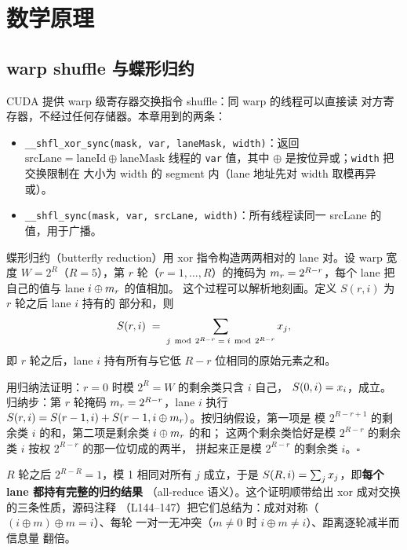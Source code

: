 \section{数学原理}\label{sec:ch02-math}

\subsection{warp shuffle 与蝶形归约}

CUDA 提供 warp 级寄存器交换指令 shuffle：同 warp 的线程可以直接读
对方寄存器，不经过任何存储器。本章用到的两条：

\begin{itemize}
\item \texttt{\_\allowbreak{}\_\allowbreak{}shfl\_\allowbreak{}xor\_\allowbreak{}sync\allowbreak{}(mask,\allowbreak{} var,\allowbreak{} lane\allowbreak{}Mask,\allowbreak{} width)}：返回
  $\mathrm{srcLane} = \mathrm{laneId} \oplus \mathrm{laneMask}$ 线程的
  \texttt{var} 值，其中 $\oplus$ 是按位异或；\texttt{width} 把交换限制在
  大小为 width 的 segment 内（lane 地址先对 width 取模再异或）。
\item \texttt{\_\allowbreak{}\_\allowbreak{}shfl\_\allowbreak{}sync\allowbreak{}(mask,\allowbreak{} var,\allowbreak{} src\allowbreak{}Lane,\allowbreak{} width)}：所有线程读同一
  srcLane 的值，用于广播。
\end{itemize}

蝶形归约（butterfly reduction）用 xor 指令构造两两相对的 lane 对。设 warp
宽度 $W = 2^{R}$（$R = 5$），第 $r$ 轮（$r = 1, \dots, R$）的掩码为
$m\sb r = 2^{R-r}$，每个 lane 把自己的值与 lane $i \oplus m\sb r$ 的值相加。
这个过程可以解析地刻画。定义 $S(r, i)$ 为 $r$ 轮之后 lane $i$ 持有的
部分和，则
\begin{equation}
  S(r, i) \;=\; \sum\sb{j \,\bmod\, 2^{R-r} \;=\; i \,\bmod\, 2^{R-r}} x\sb j,
  \label{eq:ch02-invariant}
\end{equation}
即 $r$ 轮之后，lane $i$ 持有所有与它低 $R-r$ 位相同的原始元素之和。

用归纳法证明：$r = 0$ 时模 $2^{R} = W$ 的剩余类只含 $i$ 自己，
$S(0, i) = x\sb i$，成立。归纳步：第 $r$ 轮掩码 $m\sb r = 2^{R-r}$，lane $i$
执行 $S(r, i) = S(r-1, i) + S(r-1, i \oplus m\sb r)$。按归纳假设，第一项是
模 $2^{R-r+1}$ 的剩余类 $i$ 的和，第二项是剩余类 $i \oplus m\sb r$ 的和；
这两个剩余类恰好是模 $2^{R-r}$ 的剩余类 $i$ 按权 $2^{R-r}$ 的那一位切成的两半，
拼起来正是模 $2^{R-r}$ 的剩余类 $i$。$\square$

$R$ 轮之后 $2^{R-R} = 1$，模 1 相同对所有 $j$ 成立，于是
$S(R, i) = \sum\sb j x\sb j$，即\textbf{每个 lane 都持有完整的归约结果}
（all-reduce 语义）。这个证明顺带给出 xor 成对交换的三条性质，源码注释
（L144--147）把它们总结为：成对对称（$(i \oplus m) \oplus m = i$）、每轮
一对一无冲突（$m \neq 0$ 时 $i \oplus m \neq i$）、距离逐轮减半而信息量
翻倍。

